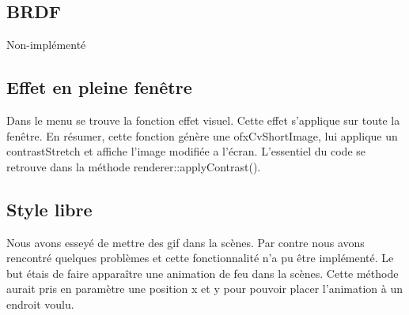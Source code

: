 \subsection{BRDF}
Non-implémenté

\subsection{Effet en pleine fenêtre}
Dans le menu se trouve la fonction effet visuel. Cette effet s'applique sur toute la fenêtre. En résumer, cette fonction génère une ofxCvShortImage, lui applique un contrastStretch et affiche l'image modifiée a l'écran. L'essentiel du code se retrouve dans la méthode renderer::applyContrast().

\subsection{Style libre}
Nous avons esseyé de mettre des gif dans la scènes. Par contre nous avons rencontré quelques problèmes et cette fonctionnalité n'a pu être implémenté. Le but étais de faire apparaître une animation de feu dans la scènes. Cette méthode aurait pris en paramètre une position x et y pour pouvoir placer l'animation à un endroit voulu. 


